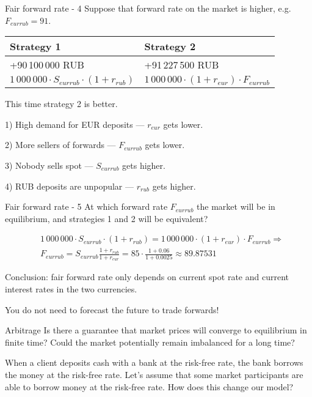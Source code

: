 \documentclass{beamer}
\begin{document}
\begin{frame}{Fair forward rate - 4}
\justify
Suppose that forward rate on the market is higher, e.g. $F_{eurrub}=91$.


\justify
\centering
\begin{tabular}{l|l}
Strategy 1 & Strategy 2 \\ \hline
+90\,100\,000 RUB  & +91\,227\,500 RUB \\
$1\,000\,000 \cdot S_{eurrub} \cdot (1+r_{rub})$ & $1\,000\,000 \cdot (1+r_{eur}) \cdot F_{eurrub}$
\end{tabular}

\justify
This time strategy 2 is better. 

1) High demand for EUR deposits --- $r_{eur}$ gets lower.

2) More sellers of forwards --- $F_{eurrub}$ gets lower.

3) Nobody sells spot --- $S_{eurrub}$ gets higher. 

4) RUB deposits are unpopular --- $r_{rub}$ gets higher.
\end{frame}



\begin{frame}{Fair forward rate - 5}
\justify
At which forward rate $F_{eurrub}$ the market will be in equilibrium, and strategies 1 and 2 will be equivalent?

\begin{align*}
&1\,000\,000 \cdot S_{eurrub} \cdot (1 + r_{rub}) = 1\,000\,000 \cdot (1+r_{eur}) \cdot F_{eurrub} \Rightarrow \\
&F_{eurrub} = S_{eurrub} \frac{1 + r_{rub}}{1 + r_{eur}} = 85 \cdot \frac{1 + 0.06}{1 + 0.0025} \approx 89.87531
\end{align*}

\justify
Conclusion: fair forward rate only depends on current spot rate and current interest rates in the two currencies.

\justify
You do not need to forecast the future to trade forwards!
\end{frame}



\begin{frame}{Arbitrage}
\justify
Is there a guarantee that market prices will converge to equilibrium in finite time? Could the market potentially remain imbalanced for a long time?

\justify
When a client deposits cash with a bank at the risk-free rate, the bank borrows the money at the risk-free rate. Let's assume that some market participants are able to borrow money at the risk-free rate. How does this change our model?
\end{frame}
\end{document}
